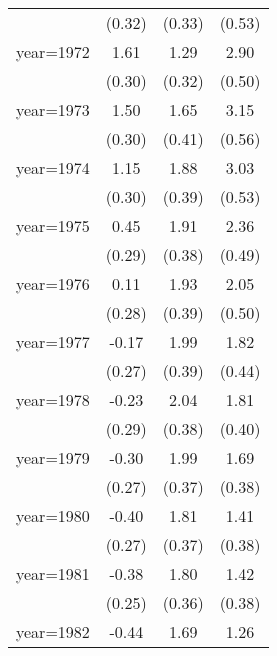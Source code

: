 \begin{sidewaystable}[htbp]
\begin{tabular}{l*{3}{c}}
                &   (0.32)         &   (0.33)         &   (0.53)         \\
\addlinespace
year=1972       &     1.61\sym{***}&     1.29\sym{***}&     2.90\sym{***}\\
                &   (0.30)         &   (0.32)         &   (0.50)         \\
\addlinespace
year=1973       &     1.50\sym{***}&     1.65\sym{***}&     3.15\sym{***}\\
                &   (0.30)         &   (0.41)         &   (0.56)         \\
\addlinespace
year=1974       &     1.15\sym{***}&     1.88\sym{***}&     3.03\sym{***}\\
                &   (0.30)         &   (0.39)         &   (0.53)         \\
\addlinespace
year=1975       &     0.45         &     1.91\sym{***}&     2.36\sym{***}\\
                &   (0.29)         &   (0.38)         &   (0.49)         \\
\addlinespace
year=1976       &     0.11         &     1.93\sym{***}&     2.05\sym{***}\\
                &   (0.28)         &   (0.39)         &   (0.50)         \\
\addlinespace
year=1977       &    -0.17         &     1.99\sym{***}&     1.82\sym{***}\\
                &   (0.27)         &   (0.39)         &   (0.44)         \\
\addlinespace
year=1978       &    -0.23         &     2.04\sym{***}&     1.81\sym{***}\\
                &   (0.29)         &   (0.38)         &   (0.40)         \\
\addlinespace
year=1979       &    -0.30         &     1.99\sym{***}&     1.69\sym{***}\\
                &   (0.27)         &   (0.37)         &   (0.38)         \\
\addlinespace
year=1980       &    -0.40         &     1.81\sym{***}&     1.41\sym{***}\\
                &   (0.27)         &   (0.37)         &   (0.38)         \\
\addlinespace
year=1981       &    -0.38         &     1.80\sym{***}&     1.42\sym{***}\\
                &   (0.25)         &   (0.36)         &   (0.38)         \\
\addlinespace
year=1982       &    -0.44\sym{*}  &     1.69\sym{***}&     1.26\sym{***}\\

\end{tabular}
\end{sidewaystable}
